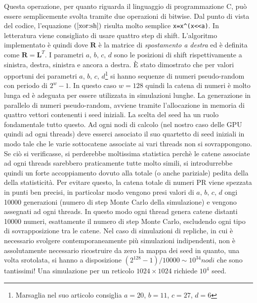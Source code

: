\documentclass[a4paper,12pt]{article}
\begin{document}
Questa operazione, per quanto riguarda il linguaggio di programmazione C, può essere semplicemente svolta tramite due operazioni di bitwise. Dal punto di vista del codice, 
l'equazione $(\ref{xor:sh})$ risulta molto semplice \texttt{x\;=\;x\;\^\;(x<<a)}. In letteratura viene consigliato di usare quattro step di shift. L'algoritmo implementato è quindi 
dove $\mathbf{R}$ è la matrice di \textit{spostamento a destra} ed è definita come $\mathbf{R} = \mathbf{L}^T$. I parametri $a,\, b,\, c,\, d$ sono le posizioni di shift rispettivamente a sinistra, destra, sinistra e ancora a destra. \`E stato dimostrato che per valori opportuni dei parametri $a,\, b,\, c,\, d$\footnote{Marsaglia nel suo articolo consiglia $a=20$, $b=11$, $c=27$, $d=6$} si hanno sequenze di numeri pseudo-random con periodo di $2^w-1$. In questo caso $w=128$ quindi la catena di numeri è molto lunga ed è adeguata per essere utilizzata in simulazioni lunghe. La generazione in parallelo di numeri pseudo-random, avviene tramite l'allocazione in memoria di quattro vettori contenenti i seed iniziali. La scelta del seed ha un ruolo fondamentale tutto questo. Ad ogni nodi di calcolo (nel nostro caso delle GPU quindi ad ogni threads) deve esserci associato il suo quartetto di seed iniziali in modo tale che le varie sottocatene associate ai vari threads non si sovrappongono. Se ciò si verificasse, si perderebbe moltissima statistica perchè le catene associate ad ogni threads sarebbero praticamente tutte molto simili, si introdurrebbe quindi un forte accoppiamento dovuto alla totale (o anche pariziale) pedita della della statisticità. Per evitare questo, la catena totale di numeri PR viene spezzata in punti ben precisi, in particolar modo vengono presi valori di $a,\, b,\, c,\, d$ ongi 10000 generazioni (numero di step Monte Carlo della simulazione) e vengono assegnati ad ogni threads. In questo modo ogni thread genera catene distanti 10000 numeri, esattamente il numero di step Monte Carlo, escludendo ogni tipo di sovrapposizione tra le catene.
Nel caso di simulazioni di repliche, in cui è necessario svolgere contemporaneamente più simulazioni indipendenti, non è assolutamente necessario ricostruire da zero la mappa dei seed in quanto, una volta srotolata, si hanno a disposizione $(2^{128}-1)/10000 \sim 10^{34}nodi$ che sono tantissimi! Una simulazione per un reticolo $1024\times1024$ richiede $10^4$ seed. 
\end{document}
